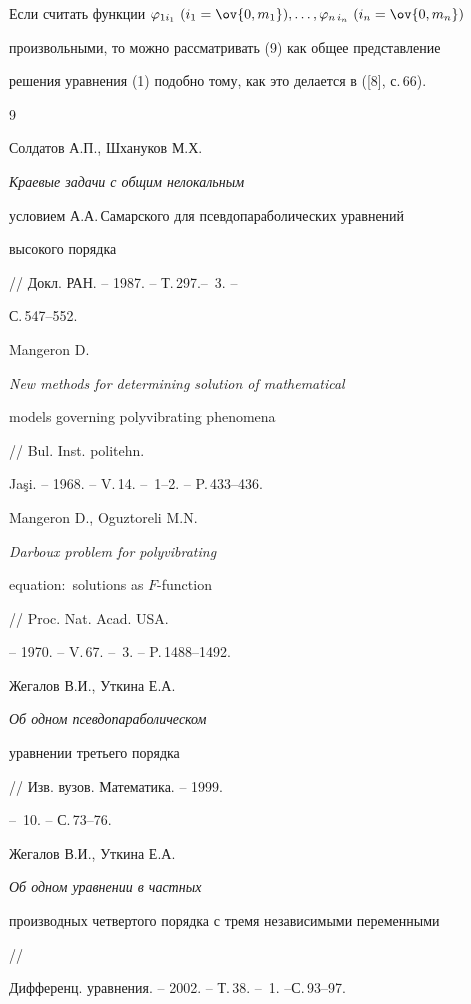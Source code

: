  


Если считать функции $\varphi_{1i_1}\ (i_1=\ov{0,m_1}),\dotsc, 


\varphi_{n\,i_n}\ (i_n=\ov{0,m_n})$ 


произвольными, то можно рассматривать (9) как общее представление 


решения уравнения (1) подобно тому, как это делается в ([8], с.\,66). 


 


 


\begin{thebibliography}{9} 


 




Солдатов А.П., Шхануков М.Х. {\em Краевые задачи с общим нелокальным 


условием А.А.\,Самарского для псевдопараболических уравнений 


высокого порядка} // Докл. РАН. -- 1987. -- Т.\,297.-- \No\,3. -- 


С.\,547--552. 




Mangeron D. {\em New methods for determining solution of mathematical 


models governing polyvibrating phenomena} // Bul. Inst. politehn. 


Ja\c si. -- 1968. -- V.\,14. -- \No\,1--2. -- P.\,433--436. 




Mangeron D., Oguztoreli M.N. {\em Darboux problem for polyvibrating 


equation${:}$ solutions as $F$-function} // Proc. Nat. Acad. USA. 


-- 1970. -- V.\,67. -- \No\,3. -- P.\,1488--1492. 




Жегалов В.И., Уткина Е.А. {\em Об одном псевдопараболическом 


уравнении третьего порядка} // Изв. вузов. Математика. -- 1999. 


-- \No\,10. -- С.\,73--76. 




Жегалов В.И., Уткина Е.А. {\em Об одном уравнении в частных 


производных четвертого порядка с тремя независимыми переменными} // 


Дифференц. уравнения. -- 2002. -- Т.\,38. -- \No\,1. --\linebreak С.\,93--97. 



\end{thebibliography}
